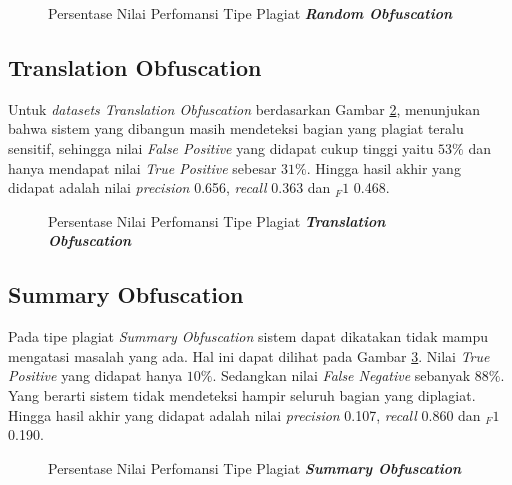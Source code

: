 \documentclass[../Book.tex]{subfiles}
\begin{document}
\begin{figure}[H]
	\centering
	\caption{Persentase Nilai Perfomansi Tipe Plagiat \textbf{\textit{Random Obfuscation}}}
	\label{fig:persranobs}
\end{figure}

\subsection{Translation Obfuscation}

\noindent Untuk \textit{datasets Translation Obfuscation} berdasarkan Gambar \ref{fig:perstransobs}, menunjukan bahwa sistem yang dibangun masih mendeteksi bagian yang plagiat teralu sensitif, sehingga nilai \textit{False Positive} yang didapat cukup tinggi yaitu $53\%$ dan hanya mendapat nilai \textit{True Positive} sebesar $31\%$. Hingga hasil akhir yang didapat adalah nilai \textit{precision} 0.656, \textit{recall} 0.363 dan $_F{1}$ 0.468.

\begin{figure}[H]
	\centering
	\caption{Persentase Nilai Perfomansi Tipe Plagiat \textbf{\textit{Translation Obfuscation}}}
	\label{fig:perstransobs}
\end{figure}

\subsection{Summary Obfuscation}

\noindent Pada tipe plagiat \textit{Summary Obfuscation} sistem dapat dikatakan tidak mampu mengatasi masalah yang ada. Hal ini dapat dilihat pada Gambar \ref{fig:perssumobs}. Nilai \textit{True Positive} yang didapat hanya $10\%$. Sedangkan nilai \textit{False Negative} sebanyak $88\%$. Yang berarti sistem tidak mendeteksi hampir seluruh bagian yang diplagiat. Hingga hasil akhir yang didapat adalah nilai \textit{precision} 0.107, \textit{recall} 0.860 dan $_F{1}$ 0.190.

\begin{figure}[H]
	\centering
	\caption{Persentase Nilai Perfomansi Tipe Plagiat \textbf{\textit{Summary Obfuscation}}}
	\label{fig:perssumobs}
\end{figure}
\end{document}
